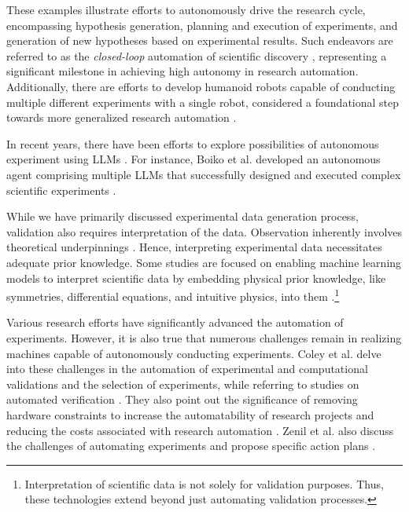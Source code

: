 \documentclass{article}
\begin{document}
These examples illustrate efforts to autonomously drive the research cycle, encompassing hypothesis generation, planning and execution of experiments, and generation of new hypotheses based on experimental results. Such endeavors are referred to as the \textit{closed-loop} automation of scientific discovery \cite{zenil2023future}, representing a significant milestone in achieving high autonomy in research automation. Additionally, there are efforts to develop humanoid robots capable of conducting multiple different experiments with a single robot, considered a foundational step towards more generalized research automation \cite{yachie2017robotic}.

In recent years, there have been efforts to explore possibilities of autonomous experiment using LLMs \cite{boiko2023emergent,qin2023gpt,charness2023generation}. For instance, Boiko et al. developed an autonomous agent comprising multiple LLMs that successfully designed and executed complex scientific experiments \cite{boiko2023emergent}.

While we have primarily discussed experimental data generation process,  validation also requires interpretation of the data. Observation inherently involves theoretical underpinnings \cite{hanson1965patterns}. Hence, interpreting experimental data necessitates adequate prior knowledge. Some studies are focused on enabling machine learning models to interpret scientific data by embedding physical prior knowledge, like symmetries, differential equations, and intuitive physics, into them \cite{hao2022physics,karniadakis2021physics}.\footnote{
Interpretation of scientific data is not solely for validation purposes. Thus, these technologies extend beyond just automating validation processes.
}

Various research efforts have significantly advanced the automation of experiments. However, it is also true that numerous challenges remain in realizing machines capable of autonomously conducting experiments. Coley et al. delve into these challenges in the automation of experimental and computational validations and the selection of experiments, while referring to studies on automated verification \cite{coley2020autonomousII}. They also point out the significance of removing hardware constraints to increase the automatability of research projects and reducing the costs associated with research automation \cite{coley2020autonomousII}. Zenil et al. also discuss the challenges of automating experiments and propose specific action plans \cite{zenil2023}.
\end{document}
